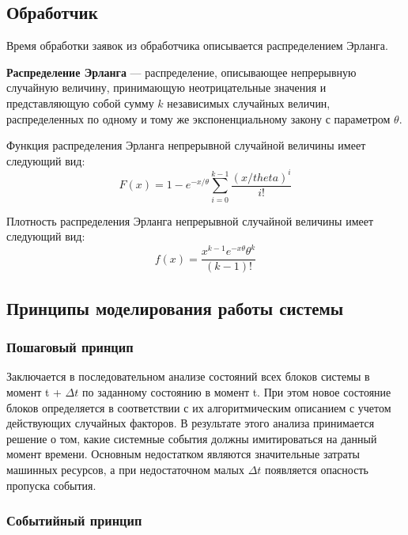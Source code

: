 \subsection*{Обработчик}

Время обработки заявок из обработчика описывается распределением Эрланга.

\textbf{Распределение Эрланга} --- распределение, описывающее непрерывную случайную величину, принимающую неотрицательные значения и представляющую собой сумму $k$ независимых случайных величин, распределенных по одному и тому же экспоненциальному закону с параметром $\theta$.

Функция распределения Эрланга непрерывной случайной величины имеет следующий вид:
\begin{equation*}
	F(x) = 1 - e^{-x/\theta} \sum_{i=0}^{k-1} \frac{(x/theta)^i}{i!} 
\end{equation*}

Плотность распределения Эрланга непрерывной случайной величины имеет следующий вид:
\begin{equation*}
	f(x) = \frac{x^{k-1}e^{-x\theta}\theta^k}{(k-1)!}
\end{equation*}

\clearpage

\subsection*{Принципы моделирования работы системы}

\subsubsection{Пошаговый принцип}

Заключается в последовательном анализе состояний всех блоков системы в момент t + $\Delta t$ по заданному состоянию в момент t.  При этом новое состояние блоков определяется в соответствии с их алгоритмическим описанием с учетом действующих случайных факторов. В результате этого анализа принимается решение о том, какие системные события должны имитироваться на данный момент времени. Основным недостатком являются значительные затраты машинных ресурсов, а при недостаточном малых $\Delta t$ появляется опасность пропуска события. 

\subsubsection{Событийный принцип}

